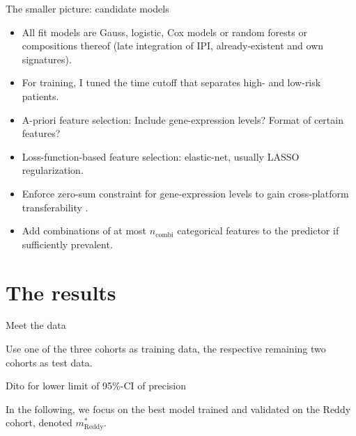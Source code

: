 \documentclass[10pt, aspectratio=169]{beamer}
\begin{document}
\begin{frame}{The smaller picture: candidate models}
  \begin{itemize}
    \item All fit models are Gauss, logistic, Cox models or random forests or compositions thereof 
      (late integration of IPI, already-existent and own signatures).
    \item For training, I tuned the time cutoff that separates high- and low-risk patients.
    \item A-priori feature selection: Include gene-expression levels? Format of certain features?
    \item Loss-function-based feature selection: elastic-net, usually LASSO regularization.
    \item Enforce zero-sum constraint for gene-expression levels to gain cross-platform 
      transferability \cite{zerosum16,transplatform17}.
    \item Add combinations of at most $n_\text{combi}$ categorical features to the predictor if 
      sufficiently prevalent.
  \end{itemize}
\end{frame}


\section{The results}

\begin{frame}{Meet the data}
  
\end{frame}

\begin{frame}{}
  Use one of the three cohorts as training data, the respective remaining two cohorts as test data.

  
\end{frame}

\begin{frame}{Dito for lower limit of 95\%-CI of precision}
  
  
  In the following, we focus on the best model trained and validated on the Reddy cohort, denoted 
  $m_\text{Reddy}^*$.
\end{frame}
\end{document}
